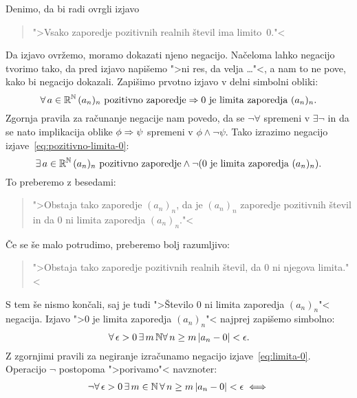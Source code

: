 \begin{primer}
  Denimo, da bi radi ovrgli izjavo
  \begin{quote}
    ">Vsako zaporedje pozitivnih realnih števil ima limito~$0$."<
  \end{quote}
  Da izjavo ovržemo, moramo dokazati njeno negacijo. Načeloma lahko
  negacijo tvorimo tako, da pred izjavo napišemo ">ni res, da velja
  \dots"<, a nam to ne pove, kako bi negacijo dokazali. Zapišimo
  prvotno izjavo v delni simbolni obliki:
  \begin{equation}
    \label{eq:pozitivno-limita-0}
    \forall\, a \in \mathbb{R}^{\mathbb{N}} \,{\text{$(a_n)_n$ pozitivno zaporedje}
      \Rightarrow \text{$0$ je limita zaporedja $(a_n)_n$}}.
  \end{equation}
  Zgornja pravila za računanje negacije nam povedo, da se
  $\lnot\forall$ spremeni v $\exists\lnot$ in da se nato implikacija
  oblike $\phi \Rightarrow \psi$ spremeni v $\phi \land \lnot\psi$. Tako
  izrazimo negacijo izjave~\eqref{eq:pozitivno-limita-0}:
  \begin{equation*}
    \exists\, a \in \mathbb{R}^{\mathbb{N}} \,{\text{$(a_n)_n$ pozitivno zaporedje}
      \land \lnot (\text{$0$ je limita zaporedja $(a_n)_n$})}.
  \end{equation*}
  To preberemo z besedami:
  \begin{quote}
    ">Obstaja tako zaporedje $(a_n)_n$, da je $(a_n)_n$ zaporedje
    pozitivnih števil in da $0$ ni limita zaporedja $(a_n)_n$."<
  \end{quote}
  Če se še malo potrudimo, preberemo bolj razumljivo:
  \begin{quote}
    ">Obstaja tako zaporedje pozitivnih realnih števil, da $0$ ni
    njegova limita."<
  \end{quote}
  S tem še nismo končali, saj je tudi ">Število $0$ ni limita
  zaporedja $(a_n)_n$"< negacija. Izjavo ">$0$ je limita zaporedja
  $(a_n)_n$"< najprej zapišemo simbolno:
  \begin{equation}
    \label{eq:limita-0}
    \forall\, \epsilon > 0 \,
      \exists\, m \,{\mathbb{N}}
        \forall\, n \geq m \,
          |a_n - 0| < \epsilon.
  \end{equation}
  Z zgornjimi pravili za negiranje izračunamo negacijo
  izjave~\eqref{eq:limita-0}. Operacijo $\lnot$ postopoma ">porivamo"<
  navznoter:
  \begin{align*}
    \lnot \all{\epsilon > 0} \some{m \in \NN} \all{n \geq m} |a_n
          - 0| < \epsilon & \iff
    \\

\end{align*}
\end{primer}
